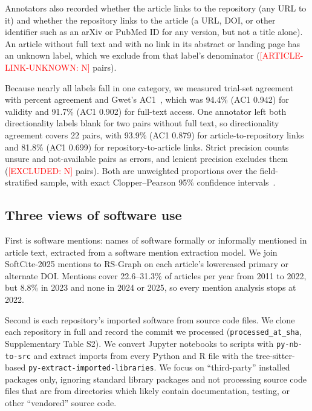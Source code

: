 \documentclass[pdflatex,sn-nature]{sn-jnl}%
\begin{document}
Annotators also recorded whether the article links to the repository (any URL to it) and whether the repository links to the article (a URL, DOI, or other identifier such as an arXiv or PubMed ID for any version, but not a title alone).
An article without full text and with no link in its abstract or landing page has an unknown label, which we exclude from that label's denominator (\textcolor{red}{[ARTICLE-LINK-UNKNOWN: N]} pairs).

Because nearly all labels fall in one category, we measured trial-set agreement with percent agreement and Gwet's AC1~\cite{gwet2008computing}, which was 94.4\% (AC1 0.942) for validity and 91.7\% (AC1 0.902) for full-text access.
One annotator left both directionality labels blank for two pairs without full text, so directionality agreement covers 22 pairs, with 93.9\% (AC1 0.879) for article-to-repository links and 81.8\% (AC1 0.699) for repository-to-article links.
Strict precision counts unsure and not-available pairs as errors, and lenient precision excludes them (\textcolor{red}{[EXCLUDED: N]} pairs).
Both are unweighted proportions over the field-stratified sample, with exact Clopper--Pearson 95\% confidence intervals~\cite{clopper1934use}.

\subsection{Three views of software use}\label{subsec:m-views}

First is software mentions: names of software formally or informally mentioned in article text, extracted from a software mention extraction model.
We join SoftCite-2025 mentions to RS-Graph on each article's lowercased primary or alternate DOI.
Mentions cover 22.6--31.3\% of articles per year from 2011 to 2022, but 8.8\% in 2023 and none in 2024 or 2025, so every mention analysis stops at 2022.

Second is each repository's imported software from source code files.
We clone each repository in full and record the commit we processed (\texttt{processed\_at\_sha}, Supplementary Table S2).
We convert Jupyter notebooks to scripts with \texttt{py-nb-to-src} and extract imports from every Python and R file with the tree-sitter-based \texttt{py-extract-imported-libraries}.
We focus on ``third-party'' installed packages only, ignoring standard library packages and not processing source code files that are from directories which likely contain documentation, testing, or other ``vendored'' source code.
\end{document}
